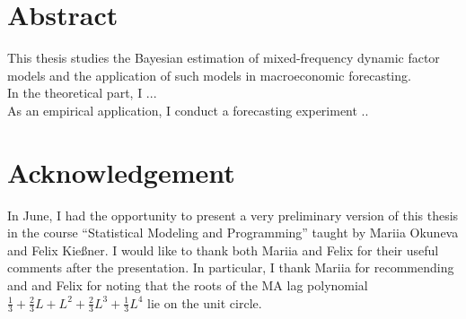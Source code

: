 \section*{Abstract}

This thesis studies the Bayesian estimation of mixed-frequency dynamic factor models and the application of such models in macroeconomic forecasting. \\
In the theoretical part, I ... \\
As an empirical application, I conduct a forecasting experiment ..


\vspace{2cm}
\section*{Acknowledgement}

In June, I had the opportunity to present a very preliminary version of this thesis in the course ``Statistical Modeling and Programming'' taught by Mariia Okuneva and Felix Kießner. I would like to thank both Mariia and Felix for their useful comments after the presentation. In particular, I thank Mariia for recommending \citet{ZhouEtal2014} and \citet{Thorsrud2016b} and Felix for noting that the roots of the MA lag polynomial $\frac{1}{3} + \frac{2}{3} L + L^2 + \frac{2}{3}L^3 + \frac{1}{3}L^4$ lie on the unit circle.